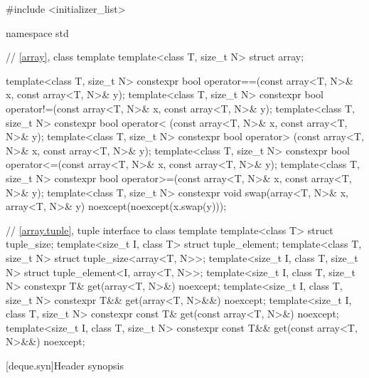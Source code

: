 %
\begin{codeblock}
#include <initializer_list>

namespace std {
  // \ref{array}, class template 
  template<class T, size_t N> struct array;

  template<class T, size_t N>
    constexpr bool operator==(const array<T, N>& x, const array<T, N>& y);
  template<class T, size_t N>
    constexpr bool operator!=(const array<T, N>& x, const array<T, N>& y);
  template<class T, size_t N>
    constexpr bool operator< (const array<T, N>& x, const array<T, N>& y);
  template<class T, size_t N>
    constexpr bool operator> (const array<T, N>& x, const array<T, N>& y);
  template<class T, size_t N>
    constexpr bool operator<=(const array<T, N>& x, const array<T, N>& y);
  template<class T, size_t N>
    constexpr bool operator>=(const array<T, N>& x, const array<T, N>& y);
  template<class T, size_t N>
    constexpr void swap(array<T, N>& x, array<T, N>& y) noexcept(noexcept(x.swap(y)));

  // \ref{array.tuple}, tuple interface to class template 
  template<class T> struct tuple_size;
  template<size_t I, class T> struct tuple_element;
  template<class T, size_t N>
    struct tuple_size<array<T, N>>;
  template<size_t I, class T, size_t N>
    struct tuple_element<I, array<T, N>>;
  template<size_t I, class T, size_t N>
    constexpr T& get(array<T, N>&) noexcept;
  template<size_t I, class T, size_t N>
    constexpr T&& get(array<T, N>&&) noexcept;
  template<size_t I, class T, size_t N>
    constexpr const T& get(const array<T, N>&) noexcept;
  template<size_t I, class T, size_t N>
    constexpr const T&& get(const array<T, N>&&) noexcept;
}
\end{codeblock}

[deque.syn]{Header  synopsis}

%

